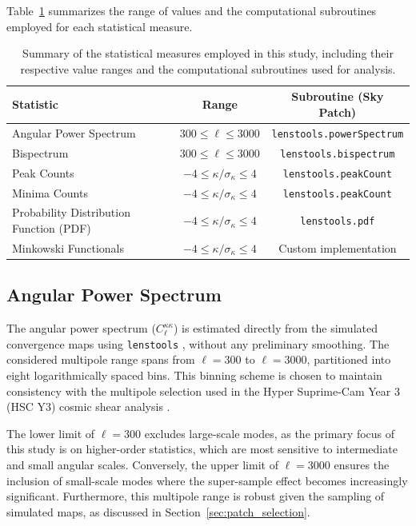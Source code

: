 Table~\ref{tab:statistics} summarizes the range of values and the computational subroutines employed for each statistical measure.
\begin{table}[htbp]
    \centering
    \begin{tabular}{lcc}
    \toprule
    \textbf{Statistic} & \textbf{Range} & \textbf{Subroutine (Sky Patch)} \\
    \midrule
    Angular Power Spectrum & $300 \leq \ell \leq 3000$ & \texttt{lenstools.powerSpectrum} \\
    Bispectrum & $300 \leq \ell \leq 3000$ & \texttt{lenstools.bispectrum} \\
    Peak Counts & $-4 \leq \kappa/\sigma_\kappa \leq 4$ & \texttt{lenstools.peakCount} \\
    Minima Counts & $-4 \leq \kappa/\sigma_\kappa \leq 4$ & \texttt{lenstools.peakCount} \\
    Probability Distribution Function (PDF) & $-4 \leq \kappa/\sigma_\kappa \leq 4$ & \texttt{lenstools.pdf} \\
    Minkowski Functionals & $-4 \leq \kappa/\sigma_\kappa \leq 4$ & Custom implementation \\
    \bottomrule
    \end{tabular}
    \caption{Summary of the statistical measures employed in this study, including their respective value ranges and the computational subroutines used for analysis.}
    \label{tab:statistics}
\end{table}

\subsection{Angular Power Spectrum}
The angular power spectrum ($C_{\ell}^{\kappa\kappa}$) is estimated directly from the simulated convergence maps using \texttt{lenstools} \citep{2016A&C....17...73P}, without any preliminary smoothing. The considered multipole range spans from $\ell = 300$ to $\ell = 3000$, partitioned into eight logarithmically spaced bins. This binning scheme is chosen to maintain consistency with the multipole selection used in the Hyper Suprime-Cam Year 3 (HSC Y3) cosmic shear analysis \citep{2023PhRvD.108l3519D}. 

The lower limit of $\ell = 300$ excludes large-scale modes, as the primary focus of this study is on higher-order statistics, which are most sensitive to intermediate and small angular scales. Conversely, the upper limit of $\ell = 3000$ ensures the inclusion of small-scale modes where the super-sample effect becomes increasingly significant. Furthermore, this multipole range is robust given the sampling of simulated maps, as discussed in Section~\ref{sec:patch_selection}.

